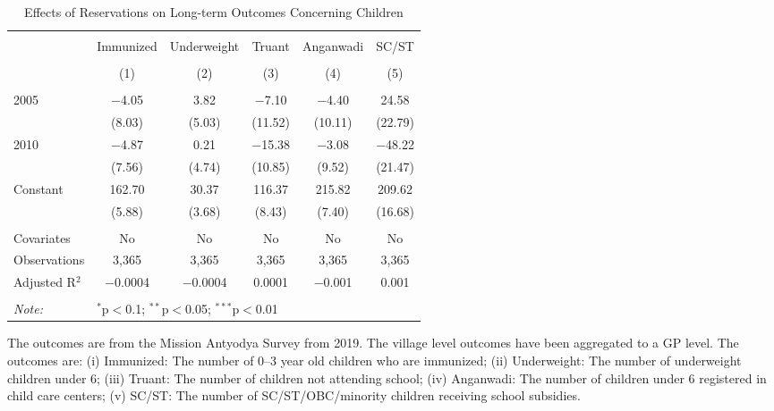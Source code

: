 \begin{table}[!htbp]
\centering
\begin{threeparttable}

  \caption{Effects of Reservations on Long-term Outcomes Concerning Children} 
  \label{raj_shrug_children_05_10} 
\scriptsize 
\begin{tabular}{@{\extracolsep{0pt}}lccccc} 
\\[-1.8ex]\hline 
\hline \\[-1.8ex] 
 & Immunized & Underweight & Truant & Anganwadi & SC/ST \\ 
\\[-1.8ex] & (1) & (2) & (3) & (4) & (5)\\ 
\hline \\[-1.8ex] 
 2005 & $-$4.05 & 3.82 & $-$7.10 & $-$4.40 & 24.58 \\ 
  & (8.03) & (5.03) & (11.52) & (10.11) & (22.79) \\ 
  2010 & $-$4.87 & 0.21 & $-$15.38 & $-$3.08 & $-$48.22 \\ 
  & (7.56) & (4.74) & (10.85) & (9.52) & (21.47) \\ 
  Constant & 162.70 & 30.37 & 116.37 & 215.82 & 209.62 \\ 
  & (5.88) & (3.68) & (8.43) & (7.40) & (16.68) \\ 
 \hline \\[-1.8ex] 
Covariates & No & No & No & No & No \\ 
Observations & 3,365 & 3,365 & 3,365 & 3,365 & 3,365 \\ 
Adjusted R$^{2}$ & $-$0.0004 & $-$0.0004 & 0.0001 & $-$0.001 & 0.001 \\ 
\hline 
\hline \\[-1.8ex] 
\textit{Note:}  & \multicolumn{5}{l}{$^{*}$p$<$0.1; $^{**}$p$<$0.05; $^{***}$p$<$0.01} \\ 
\end{tabular} 
\begin{tablenotes}[flushleft]
\scriptsize
\item The outcomes are from the Mission Antyodya Survey from 2019. 
                     The village level outcomes have been aggregated to a GP level. The outcomes are:
                    (i) Immunized: The number of 0--3 year old children who are immunized;
                    (ii) Underweight: The number of underweight children under 6;
                    (iii) Truant: The number of children not attending school;
                    (iv) Anganwadi: The number of children under 6 registered in child care centers;
                    (v) SC/ST: The number of SC/ST/OBC/minority children receiving school subsidies.
\end{tablenotes}
\end{threeparttable}
\end{table}
